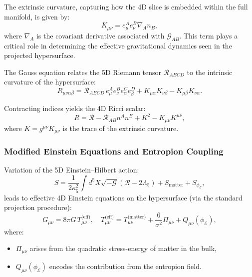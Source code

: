\documentclass[12pt]{article}
\begin{document}
The extrinsic curvature, capturing how the 4D slice is embedded within the full manifold, is given by:
\begin{equation}
K_{\mu\nu} = e^A_\mu e^B_\nu \nabla_A n_B,
\label{eq:extrinsic_curv}
\end{equation}
where \(\nabla_A\) is the covariant derivative associated with \(\mathcal{G}_{AB}\). This term plays a critical role in determining the effective gravitational dynamics seen in the projected hypersurface.

The Gauss equation relates the 5D Riemann tensor \(\mathcal{R}_{ABCD}\) to the intrinsic curvature of the hypersurface:
\begin{equation}
R_{\mu\nu\alpha\beta} = \mathcal{R}_{ABCD} \, e^A_\mu e^B_\nu e^C_\alpha e^D_\beta + K_{\mu\alpha} K_{\nu\beta} - K_{\mu\beta} K_{\nu\alpha}.
\label{eq:gauss}
\end{equation}

Contracting indices yields the 4D Ricci scalar:
\begin{equation}
R = \mathcal{R} - \mathcal{R}_{AB} n^A n^B + K^2 - K_{\mu\nu} K^{\mu\nu},
\end{equation}
where \(K = g^{\mu\nu} K_{\mu\nu}\) is the trace of the extrinsic curvature.

\subsubsection*{Modified Einstein Equations and Entropion Coupling}

Variation of the 5D Einstein–Hilbert action:
\begin{equation}
S = \frac{1}{2\kappa_5^2} \int d^5X \sqrt{-\mathcal{G}} \left( \mathcal{R} - 2 \Lambda_5 \right) + S_\text{matter} + S_{\phi_\mathcal{E}},
\label{eq:5d_action}
\end{equation}
leads to effective 4D Einstein equations on the hypersurface (via the standard projection procedure):
\begin{equation}
G_{\mu\nu} = 8\pi G \, T_{\mu\nu}^{\text{(eff)}}, \quad
T_{\mu\nu}^{\text{(eff)}} = T_{\mu\nu}^{\text{(matter)}} + \frac{6}{\sigma^2} \Pi_{\mu\nu} + Q_{\mu\nu}(\phi_\mathcal{E}),
\end{equation}
where:
\begin{itemize}
    \item \(\Pi_{\mu\nu}\) arises from the quadratic stress-energy of matter in the bulk,
    \item \(Q_{\mu\nu}(\phi_\mathcal{E})\) encodes the contribution from the entropion field.
\end{itemize}
\end{document}
